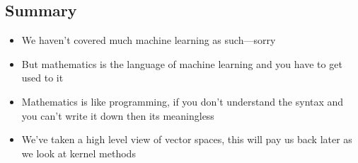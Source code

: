 \begin{slide}
\section{Summary}

\begin{PauseHighLight}
  \begin{itemize}
  \item We haven't covered much machine learning as
    such\pause---sorry\pauseb
  \item But mathematics is the language of machine learning and you have
    to get used to it\pause
  \item Mathematics is like programming, if you don't understand the
    syntax and you can't write it down then its meaningless\pause
  \item We've taken a high level view of vector spaces, this will pay us
    back later as we look at kernel methods\pause
  \end{itemize}
\end{PauseHighLight}

\end{slide}


